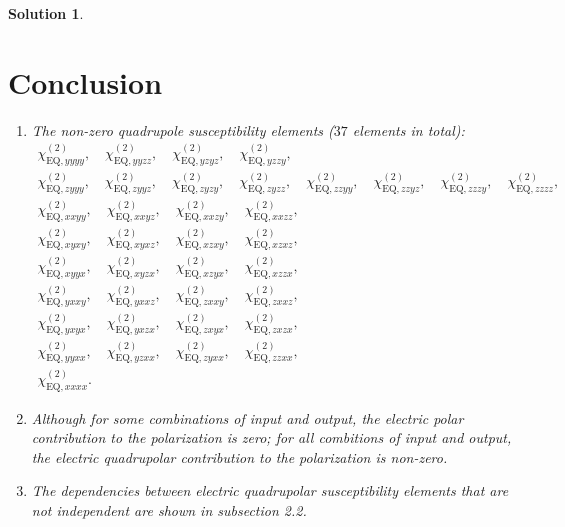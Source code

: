 \documentclass[UTF8,10pt,a4paper]{article}
\theoremstyle{Problem}
\theoremstyle{Solution}
\newtheorem*{sol}{Solution}
\begin{document}
\begin{sol}
    \section{Conclusion}
    \begin{enumerate}
        \item The non-zero quadrupole susceptibility elements ($37$ elements in total):
        \begin{gather}
            \chi_{\text{EQ},yyyy}^{(2)},\quad\chi_{\text{EQ},yyzz}^{(2)},\quad\chi_{\text{EQ},yzyz}^{(2)},\quad\chi_{\text{EQ},yzzy}^{(2)},\\
            \chi_{\text{EQ},zyyy}^{(2)},\quad\chi_{\text{EQ},zyyz}^{(2)},\quad\chi_{\text{EQ},zyzy}^{(2)},\quad\chi_{\text{EQ},zyzz}^{(2)},\quad\chi_{\text{EQ},zzyy}^{(2)},\quad\chi_{\text{EQ},zzyz}^{(2)},\quad\chi_{\text{EQ},zzzy}^{(2)},\quad\chi_{\text{EQ},zzzz}^{(2)},\\
            \chi_{\text{EQ},xxyy}^{(2)},\quad\chi_{\text{EQ},xxyz}^{(2)},\quad\chi_{\text{EQ},xxzy}^{(2)},\quad\chi_{\text{EQ},xxzz}^{(2)},\\
            \chi_{\text{EQ},xyxy}^{(2)},\quad\chi_{\text{EQ},xyxz}^{(2)},\quad\chi_{\text{EQ},xzxy}^{(2)},\quad\chi_{\text{EQ},xzxz}^{(2)},\\
            \chi_{\text{EQ},xyyx}^{(2)},\quad\chi_{\text{EQ},xyzx}^{(2)},\quad\chi_{\text{EQ},xzyx}^{(2)},\quad\chi_{\text{EQ},xzzx}^{(2)},\\
            \chi_{\text{EQ},yxxy}^{(2)},\quad\chi_{\text{EQ},yxxz}^{(2)},\quad\chi_{\text{EQ},zxxy}^{(2)},\quad\chi_{\text{EQ},zxxz}^{(2)},\\
            \chi_{\text{EQ},yxyx}^{(2)},\quad\chi_{\text{EQ},yxzx}^{(2)},\quad\chi_{\text{EQ},zxyx}^{(2)},\quad\chi_{\text{EQ},zxzx}^{(2)},\\
            \chi_{\text{EQ},yyxx}^{(2)},\quad\chi_{\text{EQ},yzxx}^{(2)},\quad\chi_{\text{EQ},zyxx}^{(2)},\quad\chi_{\text{EQ},zzxx}^{(2)},\\
            \chi_{\text{EQ},xxxx}^{(2)}.
        \end{gather}
        \item Although for some combinations of input and output, the electric polar contribution to the polarization is zero; for all combitions of input and output, the electric quadrupolar contribution to the polarization is non-zero.
        \item The dependencies between electric quadrupolar susceptibility elements that are not independent are shown in subsection 2.2.
    \end{enumerate}
\end{sol}
\end{document}
